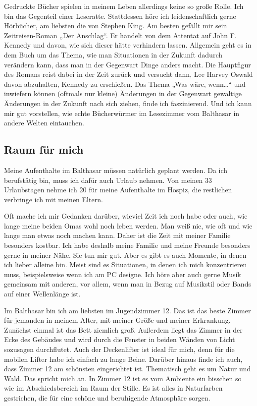 \documentclass[fontsize=14pt,a4paper,headinclude,DIV=calc,automark]{scrbook}
\begin{document}
Gedruckte Bücher spielen in meinem Leben allerdings keine so große Rolle. Ich bin das Gegenteil einer Leseratte. Stattdessen höre ich leidenschaftlich gerne Hörbücher, am liebsten die von Stephen King. Am besten gefällt mir sein Zeitreisen-Roman „Der Anschlag“. Er handelt von dem Attentat auf John F. Kennedy und davon, wie sich dieser hätte verhindern lassen. Allgemein geht es in dem Buch um das Thema, wie man Situationen in der Zukunft dadurch verändern kann, dass man in der Gegenwart Dinge anders macht. Die Hauptfigur des Romans reist dabei in der Zeit zurück und versucht dann, Lee Harvey Oswald davon abzuhalten, Kennedy zu erschießen. Das Thema „Was wäre, wenn…“ und inwiefern können (oftmals nur kleine) Änderungen in der Gegenwart gewaltige Änderungen in der Zukunft nach sich ziehen, finde ich faszinierend. Und ich kann mir gut vorstellen, wie echte Bücherwürmer im Lesezimmer vom Balthasar in andere Welten eintauchen.

\subsection{Raum für mich}

Meine Aufenthalte im Balthasar müssen natürlich geplant werden. Da ich berufstätig bin, muss ich dafür auch Urlaub nehmen. Von meinen 33 Urlaubstagen nehme ich 20 für meine Aufenthalte im Hospiz, die restlichen verbringe ich mit meinen Eltern.

Oft mache ich mir Gedanken darüber, wieviel Zeit ich noch habe oder auch, wie lange meine beiden Omas wohl noch leben werden. Man weiß nie, wie oft und wie lange man etwas noch machen kann. Daher ist die Zeit mit meiner Familie besonders kostbar. Ich habe deshalb meine Familie und meine Freunde besonders gerne in meiner Nähe. Sie tun mir gut. Aber es gibt es auch Momente, in denen ich lieber alleine bin. Meist sind es Situationen, in denen ich mich konzentrieren muss, beispielsweise wenn ich am PC designe. Ich höre aber auch gerne Musik gemeinsam mit anderen, vor allem, wenn man in Bezug auf Musikstil oder Bands auf einer Wellenlänge ist.

Im Balthasar bin ich am liebsten im Jugendzimmer 12. Das ist das beste Zimmer für jemanden in meinem Alter, mit meiner Größe und meiner Erkrankung. Zunächst einmal ist das Bett ziemlich groß. Außerdem liegt das Zimmer in der Ecke des Gebäudes und wird durch die Fenster in beiden Wänden von Licht sozusagen durchflutet. Auch der Deckenlifter ist ideal für mich, denn für die mobilen Lifter habe ich einfach zu lange Beine. Darüber hinaus finde ich auch, dass Zimmer 12 am schönsten eingerichtet ist. Thematisch geht es um Natur und Wald. Das spricht mich an. In Zimmer 12 ist es vom Ambiente ein bisschen so wie im Abschiedsbereich im Raum der Stille. Es ist alles in Naturfarben gestrichen, die für eine schöne und beruhigende Atmosphäre sorgen.
\end{document}
